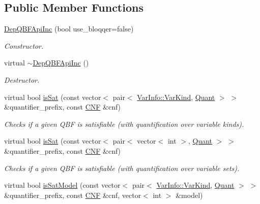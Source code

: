 \subsection*{Public Member Functions}
\begin{DoxyCompactItemize}
\item 
\hyperlink{classDepQBFApiInc_a013e8e74c09c3bc36e795d3086f13abe}{Dep\-Q\-B\-F\-Api\-Inc} (bool use\-\_\-bloqqer=false)
\begin{DoxyCompactList}\small\item\em Constructor. \end{DoxyCompactList}\item 
virtual \hyperlink{classDepQBFApiInc_a0ccf94c512221ae643199c230228b3d6}{$\sim$\-Dep\-Q\-B\-F\-Api\-Inc} ()
\begin{DoxyCompactList}\small\item\em Destructor. \end{DoxyCompactList}\item 
virtual bool \hyperlink{classDepQBFApiInc_a7c99e11dd78c20aafb159c3633daae1d}{is\-Sat} (const vector$<$ pair$<$ \hyperlink{classVarInfo_a64d1da76cf84fe674e5fef9764ef11cf}{Var\-Info\-::\-Var\-Kind}, \hyperlink{classQBFSolver_ac091e263cb55286cc07b2451bcf4d3c7}{Quant} $>$ $>$ \&quantifier\-\_\-prefix, const \hyperlink{classCNF}{C\-N\-F} \&cnf)
\begin{DoxyCompactList}\small\item\em Checks if a given Q\-B\-F is satisfiable (with quantification over variable kinds). \end{DoxyCompactList}\item 
virtual bool \hyperlink{classDepQBFApiInc_a33426c8cfba9cfe5504bdf9c28f988a2}{is\-Sat} (const vector$<$ pair$<$ vector$<$ int $>$, \hyperlink{classQBFSolver_ac091e263cb55286cc07b2451bcf4d3c7}{Quant} $>$ $>$ \&quantifier\-\_\-prefix, const \hyperlink{classCNF}{C\-N\-F} \&cnf)
\begin{DoxyCompactList}\small\item\em Checks if a given Q\-B\-F is satisfiable (with quantification over variable sets). \end{DoxyCompactList}\item 
virtual bool \hyperlink{classDepQBFApiInc_a76c8046078bcd13fe864e1b8621ed6c3}{is\-Sat\-Model} (const vector$<$ pair$<$ \hyperlink{classVarInfo_a64d1da76cf84fe674e5fef9764ef11cf}{Var\-Info\-::\-Var\-Kind}, \hyperlink{classQBFSolver_ac091e263cb55286cc07b2451bcf4d3c7}{Quant} $>$ $>$ \&quantifier\-\_\-prefix, const \hyperlink{classCNF}{C\-N\-F} \&cnf, vector$<$ int $>$ \&model)

\end{DoxyCompactItemize}
